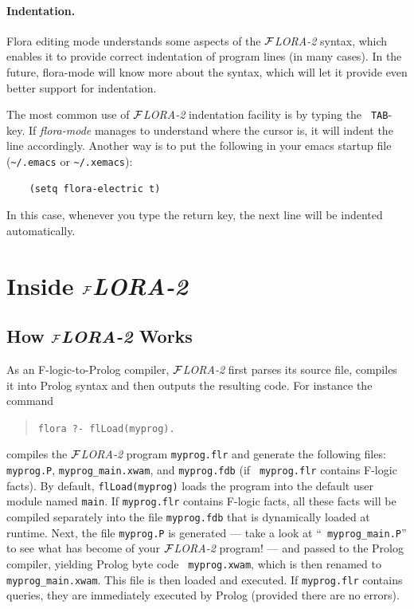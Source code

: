 \documentclass[11pt]{article}
\newcommand{\FLORA}{{\mbox{${\cal F}${\small\it LORA}\rm\emph{-2}}}\xspace}
\newcommand{\fl}{\mbox{F-logic}\xspace}
\newcommand{\ofile}{xwam}
\begin{document}
\paragraph{Indentation.}
Flora editing mode understands some aspects of the \FLORA syntax, which
enables it to provide correct indentation of program lines (in many cases).
In the future, flora-mode will know more about the syntax, which will let
it provide even better support for indentation.

The most common use of \FLORA indentation facility is by typing the {\tt
  TAB}-key. If \emph{flora-mode} manages to understand where the cursor is,
it will indent the line accordingly. Another way is to put the following in
your emacs startup file (\verb|~/.emacs| or \verb|~/.xemacs|):
\begin{verbatim}
    (setq flora-electric t)  
\end{verbatim}
In this case, whenever you type the return key, the next line will be
indented automatically.




\newpage
\section{Inside \FLORA}

\subsection{How \FLORA Works}


As an \fl-to-Prolog compiler, \FLORA first parses its source file,
compiles it into Prolog syntax and then outputs the resulting code. For
instance the command 
\begin{quote}
\verb|flora ?- flLoad(myprog).|
\end{quote}
compiles the \FLORA program {\tt myprog.flr} and generate the following
files: {\tt myprog.P}, {\tt myprog\_main.\ofile}, and {\tt myprog.fdb} (if {\tt
  myprog.flr} contains \fl facts).  By default, {\tt flLoad(myprog)} loads
the program into the default user module named {\tt main}. If {\tt myprog.flr}
contains \fl facts, all these facts will be compiled separately into the
file {\tt myprog.fdb} that is dynamically loaded at runtime.  Next, the
file {\tt myprog.P} is generated --- take a look at ``{\tt
  myprog\_main.P}'' to see what has become of your \FLORA program! --- and
passed to the Prolog compiler, yielding Prolog byte code {\tt
myprog.\ofile}, which
is then renamed to {\tt myprog\_main.\ofile}. This file is then loaded and
executed.  If {\tt myprog.flr} contains queries, they are immediately
executed by Prolog (provided there are no errors).
\end{document}
